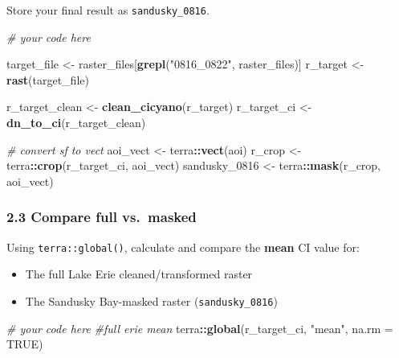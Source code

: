 \documentclass[
]{article}
\newenvironment{Shaded}{\begin{snugshade}}{\end{snugshade}}
\newcommand{\AttributeTok}[1]{\textcolor[rgb]{0.13,0.29,0.53}{#1}}
\newcommand{\CommentTok}[1]{\textcolor[rgb]{0.56,0.35,0.01}{\textit{#1}}}
\newcommand{\ConstantTok}[1]{\textcolor[rgb]{0.56,0.35,0.01}{#1}}
\newcommand{\FunctionTok}[1]{\textcolor[rgb]{0.13,0.29,0.53}{\textbf{#1}}}
\newcommand{\NormalTok}[1]{#1}
\newcommand{\OtherTok}[1]{\textcolor[rgb]{0.56,0.35,0.01}{#1}}
\newcommand{\SpecialCharTok}[1]{\textcolor[rgb]{0.81,0.36,0.00}{\textbf{#1}}}
\newcommand{\StringTok}[1]{\textcolor[rgb]{0.31,0.60,0.02}{#1}}
\providecommand{\tightlist}{%
  \setlength{\itemsep}{0pt}\setlength{\parskip}{0pt}}
\begin{document}
Store your final result as \texttt{sandusky\_0816}.

\begin{Shaded}
\begin{Highlighting}[]
\CommentTok{\# your code here}

\NormalTok{target\_file }\OtherTok{\textless{}{-}}\NormalTok{ raster\_files[}\FunctionTok{grepl}\NormalTok{(}\StringTok{"0816\_0822"}\NormalTok{, raster\_files)]}
\NormalTok{r\_target }\OtherTok{\textless{}{-}} \FunctionTok{rast}\NormalTok{(target\_file)}

\NormalTok{r\_target\_clean }\OtherTok{\textless{}{-}} \FunctionTok{clean\_cicyano}\NormalTok{(r\_target)}
\NormalTok{r\_target\_ci }\OtherTok{\textless{}{-}} \FunctionTok{dn\_to\_ci}\NormalTok{(r\_target\_clean)}

\CommentTok{\# convert sf to vect}
\NormalTok{aoi\_vect }\OtherTok{\textless{}{-}}\NormalTok{ terra}\SpecialCharTok{::}\FunctionTok{vect}\NormalTok{(aoi)}
\NormalTok{r\_crop }\OtherTok{\textless{}{-}}\NormalTok{ terra}\SpecialCharTok{::}\FunctionTok{crop}\NormalTok{(r\_target\_ci, aoi\_vect)}
\NormalTok{sandusky\_0816 }\OtherTok{\textless{}{-}}\NormalTok{ terra}\SpecialCharTok{::}\FunctionTok{mask}\NormalTok{(r\_crop, aoi\_vect)}
\end{Highlighting}
\end{Shaded}

\hypertarget{compare-full-vs.-masked}{%
\subsubsection{2.3 Compare full
vs.~masked}\label{compare-full-vs.-masked}}

Using \texttt{terra::global()}, calculate and compare the \textbf{mean}
CI value for:

\begin{itemize}
\tightlist
\item
  The full Lake Erie cleaned/transformed raster
\item
  The Sandusky Bay-masked raster (\texttt{sandusky\_0816})
\end{itemize}

\begin{Shaded}
\begin{Highlighting}[]
\CommentTok{\# your code here}
\CommentTok{\#full erie mean }
\NormalTok{terra}\SpecialCharTok{::}\FunctionTok{global}\NormalTok{(r\_target\_ci, }\StringTok{"mean"}\NormalTok{, }\AttributeTok{na.rm =} \ConstantTok{TRUE}\NormalTok{)}
\end{Highlighting}
\end{Shaded}
\end{document}
